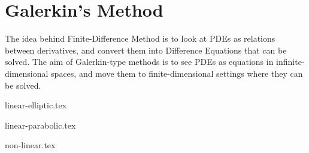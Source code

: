 \chapter{Galerkin's Method}

The idea behind Finite-Difference Method is to look at PDEs as relations between derivatives, and convert them into Difference Equations that can be solved. The aim of Galerkin-type methods is to see PDEs as equations in infinite-dimensional spaces, and move them to finite-dimensional settings where they can be solved.

{linear-elliptic.tex}

{linear-parabolic.tex}

{non-linear.tex}

\printbibliography[heading=subbibliography]
